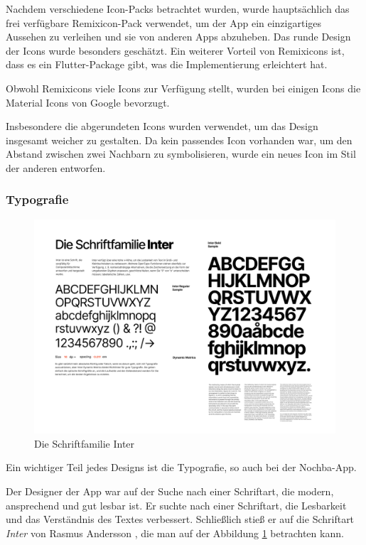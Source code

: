 Nachdem verschiedene Icon-Packs betrachtet wurden, wurde hauptsächlich das frei verfügbare Remixicon-Pack\cite{remixicon} verwendet, um der App ein einzigartiges Aussehen zu verleihen und sie von anderen Apps abzuheben. Das runde Design der Icons wurde besonders geschätzt. Ein weiterer Vorteil von Remixicons ist, dass es ein Flutter-Package\cite{remixicon_flutter_package} gibt, was die Implementierung erleichtert hat.

Obwohl Remixicons viele Icons zur Verfügung stellt, wurden bei einigen Icons die Material Icons\cite{material_icons} von Google bevorzugt.

Insbesondere die abgerundeten Icons wurden verwendet, um das
Design insgesamt weicher zu gestalten. Da kein passendes
Icon vorhanden war, um den Abstand zwischen zwei Nachbarn zu
symbolisieren, wurde ein neues Icon im Stil der anderen
entworfen.

\subsubsection{Typografie}
\begin{figure}[H]
  \centering
  \includegraphics[width=1\textwidth]{pics/font.png}
  \caption{Die Schriftfamilie Inter}
  \label{fig:font}
\end{figure}

Ein wichtiger Teil jedes Designs ist die Typografie, so auch bei der Nochba-App.

Der Designer der App war auf der Suche nach einer
Schriftart, die modern, ansprechend und gut lesbar ist. Er
suchte nach einer Schriftart, die Lesbarkeit und das
Verständnis des Textes verbessert. Schließlich stieß er auf
die Schriftart \textit{Inter} von Rasmus Andersson
\cite{inter-font}, die man auf der Abbildung \ref{fig:font}
betrachten kann.

